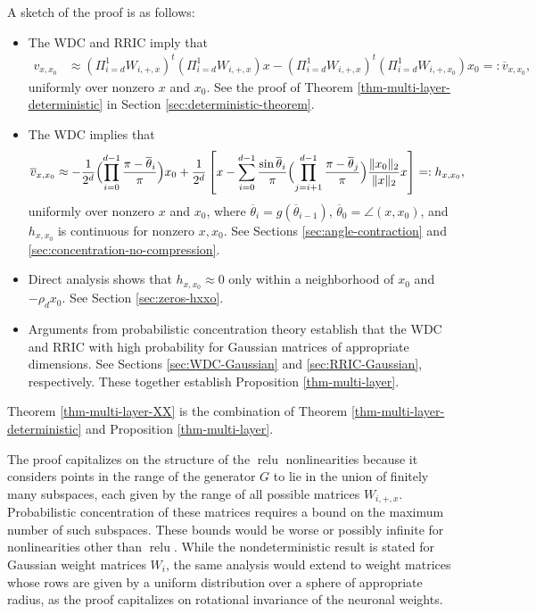 \documentclass[11pt]{article}
\newcommand{\thetabar}{\overline{\theta}}
\newcommand{\red}[1]{{\color{black} #1}}
\newcommand{\xo}{x_0}
\newcommand{\hxxo}{h_{x, \xo}}
\newcommand{\PiWd}{\Pi_{i=d}^1 W_{i,+,x}}
\newcommand{\PiWdo}{\Pi_{i=d}^1 W_{i,+,\xo}}
\newcommand{\Wipx}{W_{i, +, x}}
\newcommand{\vxxo}{v_{x, \xo}}
\newcommand{\vbarxxo}{\overline{v}_{x, \xo}}
\DeclareMathOperator{\relu}{relu}
\begin{document}
A sketch of the proof is as follows:  
\begin{itemize}
\item The WDC and RRIC imply that
\begin{align*}
\vxxo &\approx (\PiWd)^t  (\PiWd) x -  (\PiWd)^t (\PiWdo) \xo =: 
\vbarxxo,
\end{align*}
uniformly over nonzero $x$ and $\xo$.  See the proof of Theorem \ref{thm-multi-layer-deterministic} in Section \ref{sec:deterministic-theorem}.
\item The WDC implies that
\begin{align*}
\vbarxxo &\approx  - \frac{1}{2^d} \Bigl( \prod_{i=0}^{d-1} \frac{\pi - \thetabar_i}{\pi}  \Bigr)\xo 
+ \frac{1}{2^d} \left[ x - \sum_{i=0}^{d-1} \frac{\sin \thetabar_i}{\pi}  \Bigl( \prod_{j=i+1}^{d-1} \frac{\pi - \thetabar_j}{\pi}  \Bigr)  \frac{\|\xo\|_2}{\|x\|_2} x  \right] =: \hxxo, 
\end{align*}
uniformly over nonzero $x$ and $\xo$, where
$\thetabar_i = g(\thetabar_{i-1})$, $\thetabar_0 = \angle(x,\xo)$, and $\hxxo$ is continuous for nonzero $x, \xo$.  See Sections \ref{sec:angle-contraction} and  \ref{sec:concentration-no-compression}.  
\item Direct analysis shows that $\hxxo \approx 0$ only within a neighborhood of $\xo$ and $-\rho_d \xo$.   See Section \ref{sec:zeros-hxxo}.
\item Arguments from probabilistic concentration theory establish that the WDC and RRIC with high probability for Gaussian matrices of appropriate dimensions.  See Sections \ref{sec:WDC-Gaussian} and \ref{sec:RRIC-Gaussian}, respectively.  These together establish Proposition \ref{thm-multi-layer}.
\end{itemize}
Theorem \ref{thm-multi-layer-XX} is the combination of Theorem \ref{thm-multi-layer-deterministic} and Proposition \ref{thm-multi-layer}.

\red{
The proof capitalizes on the structure of the $\relu$ nonlinearities because it considers points in the range of the generator $G$ to lie in the union of finitely many subspaces, each given by the range of all possible matrices $\Wipx$.   Probabilistic concentration of these matrices requires a bound on the maximum number of such subspaces.  These bounds would be worse or possibly infinite for nonlinearities other than $\relu$.  While the nondeterministic result is stated for Gaussian weight matrices $W_i$, the same analysis would extend to weight matrices whose rows are given by a uniform distribution over a sphere of appropriate radius, as the proof capitalizes on rotational invariance of the neuronal weights.
}
\end{document}
